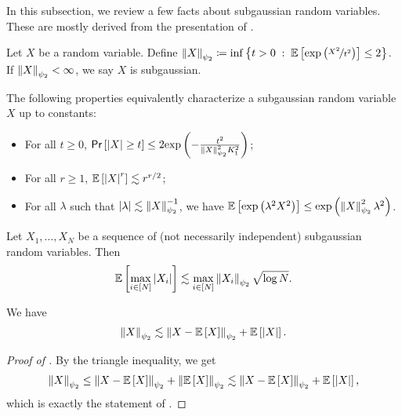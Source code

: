 \documentclass[11pt]{article}
\numberwithin{equation}{section}
\begin{document}
In this subsection, we review a few facts about subgaussian random variables. These are mostly derived from the presentation of \citet{vershynin_2018}.

\begin{definition}
\label{defn:subgaussian}
Let $X$ be a random variable. Define $\left\lVert X \right\rVert_{\psi_2} \coloneqq \inf\left\{t > 0 {\;\; : \;\;} \mathbb{E}\left[\mathrm{exp}\left(\nicefrac{X^2}{t^2}\right)\right] \le 2\right\}$. If $\left\lVert X \right\rVert_{\psi_2} < \infty$, we say $X$ is subgaussian.
\end{definition}

\begin{fact}
\label{fact:subgaussian_properties}
The following properties equivalently characterize a subgaussian random variable $X$ up to constants:
\begin{itemize}
    \item For all $t \ge 0$, $\mathsf{Pr}\left[\left\lvert X \right\rvert \ge t\right] \le 2\mathrm{exp}\left(-\frac{t^2}{\left\lVert X \right\rVert_{\psi_2}^2K_1^2}\right)$;
    \item For all $r \ge 1$, $\mathbb{E}\left[\left\lvert X \right\rvert^r\right] \lesssim r^{r/2}$;
    \item For all $\lambda$ such that $\left\lvert \lambda \right\rvert \lesssim \left\lVert X \right\rVert_{\psi_2}^{-1}$, we have $\mathbb{E}\left[\mathrm{exp}\left(\lambda^2X^2\right)\right] \le \mathrm{exp}\left(\left\lVert X \right\rVert_{\psi_2}^2\lambda^2\right)$.
\end{itemize}
\end{fact}

\begin{fact}
\label{fact:max_subgaussians}
Let $X_1,\dots,X_N$ be a sequence of (not necessarily independent) subgaussian random variables. Then
\begin{align*}
    \mathbb{E}\left[\max_{i \in [N]} \left\lvert X_i \right\rvert\right] \lesssim \max_{i \in [N]} \left\lVert X_i \right\rVert_{\psi_2}\sqrt{\log N}.
\end{align*}
\end{fact}

\begin{fact}[Decentering]
\label{fact:uncentering}
We have
\begin{align*}
    \left\lVert X \right\rVert_{\psi_2} \lesssim \left\lVert X - \mathbb{E}\left[X\right] \right\rVert_{\psi_2} + \mathbb{E}\left[\left\lvert X \right\rvert\right].
\end{align*}
\end{fact}
\begin{proof}[Proof of ]
By the triangle inequality, we get
\begin{align*}
    \left\lVert X \right\rVert_{\psi_2} \le \left\lVert X - \mathbb{E}\left[X\right] \right\rVert_{\psi_2} + \left\lVert \mathbb{E}\left[X\right] \right\rVert_{\psi_2} \lesssim \left\lVert X-\mathbb{E}\left[X\right] \right\rVert_{\psi_2} + \mathbb{E}\left[\left\lvert X \right\rvert\right],
\end{align*}
which is exactly the statement of .
\end{proof}
\end{document}
